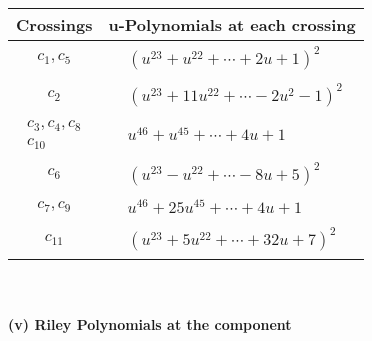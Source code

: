 \documentclass[1p]{elsarticle_modified}
\theoremstyle{definition}
\begin{document}
\begin{tabular}{m{50pt}|m{274pt}}
Crossings & \hspace{64pt}u-Polynomials at each crossing \\
\hline $$\begin{aligned}c_{1},c_{5}\end{aligned}$$&$\begin{aligned}
&(u^{23}+u^{22}+\cdots+2 u+1)^{2}
\end{aligned}$\\
\hline $$\begin{aligned}c_{2}\end{aligned}$$&$\begin{aligned}
&(u^{23}+11 u^{22}+\cdots-2 u^2-1)^{2}
\end{aligned}$\\
\hline $$\begin{aligned}c_{3},c_{4},c_{8}\\c_{10}\end{aligned}$$&$\begin{aligned}
&u^{46}+u^{45}+\cdots+4 u+1
\end{aligned}$\\
\hline $$\begin{aligned}c_{6}\end{aligned}$$&$\begin{aligned}
&(u^{23}- u^{22}+\cdots-8 u+5)^{2}
\end{aligned}$\\
\hline $$\begin{aligned}c_{7},c_{9}\end{aligned}$$&$\begin{aligned}
&u^{46}+25 u^{45}+\cdots+4 u+1
\end{aligned}$\\
\hline $$\begin{aligned}c_{11}\end{aligned}$$&$\begin{aligned}
&(u^{23}+5 u^{22}+\cdots+32 u+7)^{2}
\end{aligned}$\\
\hline
\end{tabular}\\~\\
\newpage\renewcommand{\arraystretch}{1}
\flushleft \textbf{(v) Riley Polynomials at the component}\newline \\
\end{document}

